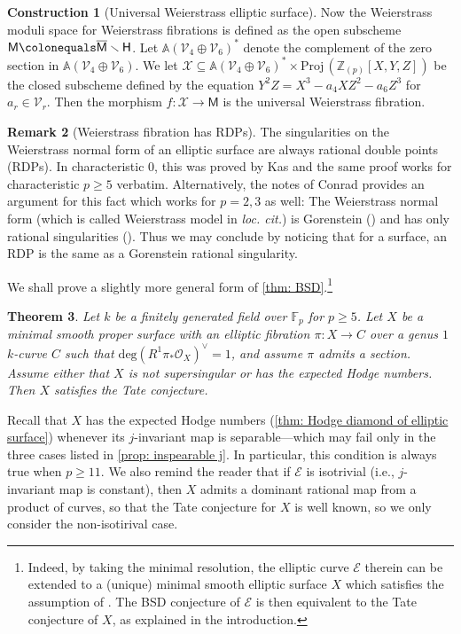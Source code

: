 \documentclass[11pt, letterpaper]{amsart}
\theoremstyle{plain}
\newtheorem{theorem}{Theorem}[section]
\theoremstyle{definition}
\newtheorem{construction}[theorem]{Construction}
\newtheorem{remark}[theorem]{Remark}
\newcommand{\IA}{\mathbb{A}}
\newcommand{\IF}{\mathbb{F}}
\newcommand{\IZ}{\mathbb{Z}}
\renewcommand{\deg}{\mathrm{deg}}
\newcommand{\<}{\langle}
\renewcommand{\>}{\rangle}
\newcommand{\sV}{\mathcal{V}}
\newcommand{\Proj}{\mathrm{Proj\,}}
\newcommand{\sE}{\mathcal{E}}
\newcommand{\sO}{\mathcal{O}}
\newcommand{\sfM}{\mathsf{M}}
\newcommand{\sX}{\mathcal{X}}
\newcommand{\sfH}{\mathsf{H}}
\begin{document}
\begin{construction}[Universal Weierstrass elliptic surface]
    
    Now the Weierstrass moduli space for Weierstrass fibrations is defined as the open subscheme $\sfM \colonequals \overline{\sfM} \smallsetminus \sfH$. Let $\IA(\sV_4 \oplus \sV_6)^*$ denote the complement of the zero section in $\IA(\sV_4 \oplus \sV_6)$.
    We let $\sX \subseteq \IA(\sV_4 \oplus \sV_6)^* \times \Proj (\IZ_{(p)}[X, Y, Z])$ be the closed subscheme defined by the equation $Y^2 Z=X^3 - a_4 X Z^2 - a_6 Z^3$ for $a_r \in \sV_r$. 
    Then the morphism $f:\sX\to \sfM$ is the universal Weierstrass fibration.
\end{construction}

\begin{remark}[Weierstrass fibration has RDPs]
\label{rmk: RDP on Weierstrass}
    The singularities on the Weierstrass normal form of an elliptic surface are always rational double points (RDPs). 
    In characteristic $0$, this was proved by Kas \cite[Thm.~1]{Kas} and the same proof works for characteristic $p \ge 5$ verbatim. 
    Alternatively, the notes of Conrad \cite{ConradElliptic} provides an argument for this fact which works for $p = 2, 3$ as well: The Weierstrass normal form (which is called Weierstrass model in \textit{loc. cit.}) is Gorenstein (\cite[\S 4]{ConradElliptic}) and has only rational singularities (\cite[\S 8]{ConradElliptic}). 
    Thus we may conclude by noticing that for a surface, an RDP is the same as a Gorenstein rational singularity.  
\end{remark}


We shall prove a slightly more general form of \cref{thm: BSD}.\footnote{Indeed, by taking the minimal resolution, the elliptic curve $\sE$ therein can be extended to a (unique) minimal smooth elliptic surface $X$ which satisfies the assumption of .
The BSD conjecture of $\sE$ is then equivalent to the Tate conjecture of $X$, as explained in the introduction.} 
\begin{theorem}
	\label{thm: BSD_more_general}
    Let $k$ be a finitely generated field over $\IF_p$ for $p \ge 5$. 
    Let $X$ be a minimal smooth proper surface with an elliptic fibration $\pi : X \to C$ over a genus $1$ $k$-curve $C$ such that $\deg (R^1 \pi_* \sO_X)^\vee = 1$, and assume $\pi$ admits a section. 
    Assume either that $X$ is not supersingular or has the expected Hodge numbers.
    Then $X$ satisfies the Tate conjecture. 
\end{theorem}
Recall that $X$ has the expected Hodge numbers (\cref{thm: Hodge diamond of elliptic surface}) whenever its $j$-invariant map is separable---which may fail only in the three cases listed in \cref{prop: inspearable j}. In particular, this condition is always true when $p \ge 11$. We also remind the reader that if $\sE$ is isotrivial (i.e., $j$-invariant map is constant), then $X$ admits a dominant rational map from a product of curves, so that the Tate conjecture for $X$ is well known, so we only consider the non-isotirival case. 
\end{document}
